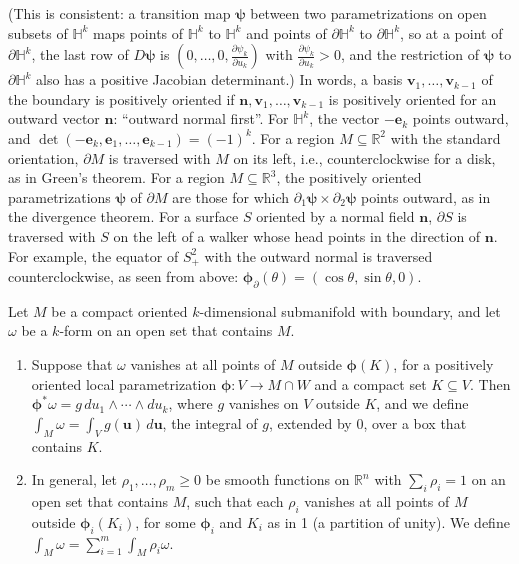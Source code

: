 (This is consistent: a transition map $\boldsymbol{\psi}$ between two parametrizations on open subsets of $\mathbb{H}^k$ maps points of $\mathbb{H}^k$ to $\mathbb{H}^k$ and points of $\partial\mathbb{H}^k$ to $\partial\mathbb{H}^k$, so at a point of $\partial\mathbb{H}^k$, the last row of $D\boldsymbol{\psi}$ is $(0, \ldots, 0, \frac{\partial\psi_k}{\partial u_k})$ with $\frac{\partial\psi_k}{\partial u_k} > 0$, and the restriction of $\boldsymbol{\psi}$ to $\partial\mathbb{H}^k$ also has a positive Jacobian determinant.) In words, a basis $\mathbf{v}_1, \ldots, \mathbf{v}_{k-1}$ of the boundary is positively oriented if $\mathbf{n}, \mathbf{v}_1, \ldots, \mathbf{v}_{k-1}$ is positively oriented for an outward vector $\mathbf{n}$: ``outward normal first''. For $\mathbb{H}^k$, the vector $-\mathbf{e}_k$ points outward, and $\det(-\mathbf{e}_k, \mathbf{e}_1, \ldots, \mathbf{e}_{k-1}) = (-1)^k$. For a region $M \subseteq \mathbb{R}^2$ with the standard orientation, $\partial M$ is traversed with $M$ on its left, i.e., counterclockwise for a disk, as in Green's theorem. For a region $M \subseteq \mathbb{R}^3$, the positively oriented parametrizations $\boldsymbol{\psi}$ of $\partial M$ are those for which $\partial_1\boldsymbol{\psi} \times \partial_2\boldsymbol{\psi}$ points outward, as in the divergence theorem. For a surface $S$ oriented by a normal field $\mathbf{n}$, $\partial S$ is traversed with $S$ on the left of a walker whose head points in the direction of $\mathbf{n}$. For example, the equator of $S^2_+$ with the outward normal is traversed counterclockwise, as seen from above: $\boldsymbol{\phi}_\partial(\theta) = (\cos\theta, \sin\theta, 0)$.

\begin{definition}\label{A-def:manifold-integral}
    Let $M$ be a compact oriented $k$-dimensional submanifold with boundary, and let $\omega$ be a $k$-form on an open set that contains $M$.
    \begin{enumerate}
        \item Suppose that $\omega$ vanishes at all points of $M$ outside $\boldsymbol{\phi}(K)$, for a positively oriented local parametrization $\boldsymbol{\phi}: V \to M \cap W$ and a compact set $K \subseteq V$. Then $\boldsymbol{\phi}^*\omega = g\, du_1 \wedge \cdots \wedge du_k$, where $g$ vanishes on $V$ outside $K$, and we define $\int_M \omega = \int_V g(\mathbf{u})\, d\mathbf{u}$, the integral of $g$, extended by $0$, over a box that contains $K$.
        \item In general, let $\rho_1, \ldots, \rho_m \geq 0$ be smooth functions on $\mathbb{R}^n$ with $\sum_i \rho_i = 1$ on an open set that contains $M$, such that each $\rho_i$ vanishes at all points of $M$ outside $\boldsymbol{\phi}_i(K_i)$, for some $\boldsymbol{\phi}_i$ and $K_i$ as in 1 (a partition of unity). We define $\int_M \omega = \sum_{i=1}^m \int_M \rho_i\omega$.
    \end{enumerate}
\end{definition}

